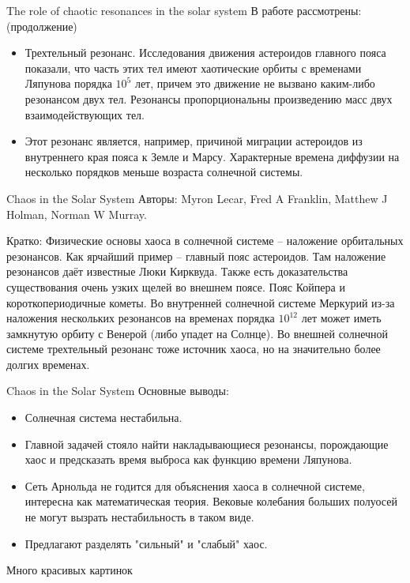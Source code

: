 \documentclass{beamer}
\begin{document}
\begin{frame}{The role of chaotic resonances in the solar system}
        В работе рассмотрены: (продолжение)
        \begin{itemize}
                \item Трехтельный резонанс. Исследования движения астероидов главного пояса показали, что часть этих тел имеют хаотические орбиты с временами Ляпунова порядка $10^5$ лет, причем это движение не вызвано каким-либо резонансом двух тел. Резонансы пропорциональны произведению масс двух взаимодействующих тел.
                \item Этот резонанс является, например, причиной миграции астероидов из внутреннего края пояса к Земле и Марсу. Характерные времена диффузии на несколько порядков меньше возраста солнечной системы.
        \end{itemize}
\end{frame}



\begin{frame}{Chaos in the Solar System}
        Авторы: Myron Lecar, Fred A Franklin, Matthew J Holman, Norman W Murray.

        Кратко: Физические основы хаоса в солнечной системе -- наложение орбитальных резонансов. Как ярчайший пример -- главный пояс астероидов. Там наложение резонансов даёт известные Люки Кирквуда. Также есть доказательства существования очень узких щелей во внешнем поясе. Пояс Койпера и короткопериодичные кометы. Во внутренней солнечной системе Меркурий из-за наложения нескольких резонансов на временах порядка $10^{12}$ лет может иметь замкнутую орбиту с Венерой (либо упадет на Солнце). Во внешней солнечной системе трехтельный резонанс тоже источник хаоса, но на значительно более долгих временах.

\end{frame}

\begin{frame}{Chaos in the Solar System}
        Основные выводы:
        \begin{itemize}
                \item Солнечная система нестабильна.
                \item Главной задачей стояло найти накладывающиеся резонансы, порождающие хаос и предсказать время выброса как функцию времени Ляпунова. 
                \item Сеть Арнольда не годится для объяснения хаоса в солнечной системе, интересна как математическая теория. Вековые колебания больших полуосей не могут вызрать нестабильность в таком виде.
                \item Предлагают разделять "сильный" и "слабый" хаос.
        \end{itemize}
        Много красивых картинок
\end{frame}
\end{document}
